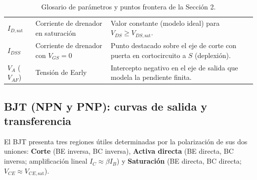 \documentclass[11pt,a4paper]{article}
\begin{document}
\begin{table}[H]
\begin{tabularx}{\textwidth}{@{}>{\raggedright\arraybackslash}p{3.4cm} >{\raggedright\arraybackslash}p{4.6cm} >{\raggedright\arraybackslash}X@{}}
			$I_{D,\mathrm{sat}}$ & Corriente de drenador en saturación & Valor constante (modelo ideal) para $V_{DS} \ge V_{DS,\mathrm{sat}}$. \\
			$I_{DSS}$ & Corriente de drenador con $V_{GS} = 0$ & Punto destacado sobre el eje de corte con puerta en cortocircuito a $S$ (deplexión). \\
			$V_A$ ($V_{AF}$) & Tensión de Early & Intercepto negativo en el eje de salida que modela la pendiente finita. \\
			\bottomrule
		\end{tabularx}
		\caption{Glosario de parámetros y puntos frontera de la Sección 2.}
	\end{table}

	\subsection{BJT (NPN y PNP): curvas de salida y transferencia}

	El BJT presenta tres regiones útiles determinadas por la polarización de sus dos uniones:
	\textbf{Corte} (BE inversa, BC inversa), \textbf{Activa directa} (BE directa, BC inversa; amplificación lineal $I_C \approx \beta I_B$) y \textbf{Saturación} (BE directa, BC directa; $V_{CE} \approx V_{CE,\mathrm{sat}}$).
\end{document}
